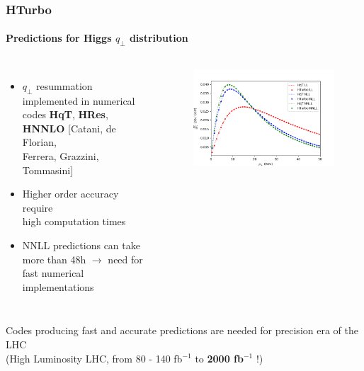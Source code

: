 \documentclass[aspectratio=43]{beamer}
\begin{document}
\begin{frame}

	\frametitle{HTurbo}
	\framesubtitle{Predictions for Higgs $q_{\perp}$ distribution}
	
	\footnotesize
	
	\begin{columns}
		
			
		\begin{itemize}
			\item $q_{\perp}$ resummation implemented in numerical codes \textbf{HqT}, \textbf{HRes}, \textbf{HNNLO} {\color{blue}[Catani, de Florian, \\ Ferrera, Grazzini, Tommasini]} 
			\item Higher order accuracy require \\
			{\color{red}high computation times}
			\item NNLL predictions can take \\ more than 48h $\longrightarrow$ need for \\ {\color{red} fast numerical implementations}
		\end{itemize}

	
		\begin{figure}
			\includegraphics[width = 6 cm]{plots/part3/chapter6/higgs_qt_all.png}
		\end{figure}		
			
	\end{columns}

	\vspace{0.5 cm}
	
	Codes producing fast and accurate predictions are needed for precision era of the LHC \\
	(High Luminosity LHC, from 80 - 140 fb$^{-1}$ to \textbf{2000 fb$^{-1}$} !)
	
\end{frame}
\end{document}
